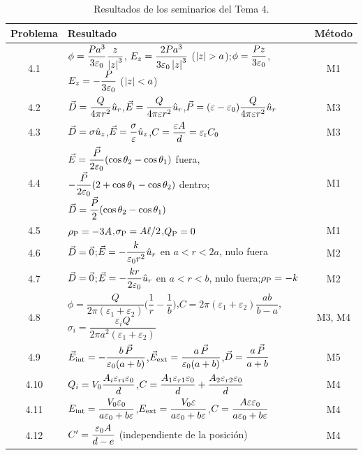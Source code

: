 \begin{table}[H]
\centering
\caption{Resultados de los seminarios del Tema 4.}\label{tab:resultados}
\small
\renewcommand{\arraystretch}{1.55}
\begin{tabularx}{\textwidth}{@{}c>{\raggedright\arraybackslash}Xc@{}}
\toprule
Problema & Resultado & Método\\
\midrule
4.1 & $\phi=\dfrac{Pa^3}{3\varepsilon_0}\dfrac{z}{\left\lvert z\right\rvert^3}$, $E_z=\dfrac{2Pa^3}{3\varepsilon_0\left\lvert z\right\rvert^3}$ ($\left\lvert z\right\rvert>a$);\quad $\phi=\dfrac{Pz}{3\varepsilon_0}$, $E_z=-\dfrac{P}{3\varepsilon_0}$ ($\left\lvert z\right\rvert<a$) & M1\\
4.2 & $\vec D=\dfrac{Q}{4\pi r^2}\hat u_{r}$,\quad $\vec E=\dfrac{Q}{4\pi\varepsilon r^2}\hat u_{r}$,\quad $\vec P=(\varepsilon-\varepsilon_0)\dfrac{Q}{4\pi\varepsilon r^2}\hat u_{r}$ & M3\\
4.3 & $\vec D=\sigma\hat u_{z}$,\quad $\vec E=\dfrac{\sigma}{\varepsilon}\hat u_{z}$,\quad $C=\dfrac{\varepsilon A}{d}=\varepsilon_{\mathrm r} C_0$ & M3\\
4.4 & $\vec E=\dfrac{\vec P}{2\varepsilon_0}(\cos\theta_2-\cos\theta_1)$ fuera, $-\dfrac{\vec P}{2\varepsilon_0}(2+\cos\theta_1-\cos\theta_2)$ dentro;\quad $\vec D=\dfrac{\vec P}{2}(\cos\theta_2-\cos\theta_1)$ & M1\\
4.5 & $\rho_{\mathrm P}=-3A$,\quad $\sigma_{\mathrm P}=A\ell/2$,\quad $Q_{\mathrm P}=0$ & M1\\
4.6 & $\vec D=\vec 0$;\quad $\vec E=-\dfrac{k}{\varepsilon_0 r^2}\hat u_{r}$ en $a<r<2a$, nulo fuera & M2\\
4.7 & $\vec D=\vec 0$;\quad $\vec E=-\dfrac{kr}{2\varepsilon_0}\hat u_{r}$ en $a<r<b$, nulo fuera;\quad $\rho_{\mathrm P}=-k$ & M2\\
4.8 & $\phi=\dfrac{Q}{2\pi(\varepsilon_1+\varepsilon_2)}\Big(\dfrac1r-\dfrac1b\Big)$,\quad $C=2\pi(\varepsilon_1+\varepsilon_2)\dfrac{ab}{b-a}$,\quad $\sigma_i=\dfrac{\varepsilon_iQ}{2\pi a^2(\varepsilon_1+\varepsilon_2)}$ & M3, M4\\
4.9 & $\vec E_{\mathrm{int}}=-\dfrac{b\,\vec P}{\varepsilon_0(a+b)}$,\quad $\vec E_{\mathrm{ext}}=\dfrac{a\,\vec P}{\varepsilon_0(a+b)}$,\quad $\vec D=\dfrac{a\,\vec P}{a+b}$ & M5\\
4.10 & $Q_i=V_0\dfrac{A_i\varepsilon_{ri}\varepsilon_0}{d}$,\quad $C=\dfrac{A_1\varepsilon_{r1}\varepsilon_0}{d}+\dfrac{A_2\varepsilon_{r2}\varepsilon_0}{d}$ & M4\\
4.11 & $E_{\mathrm{int}}=\dfrac{V_0\varepsilon_0}{a\varepsilon_0+b\varepsilon}$,\quad $E_{\mathrm{ext}}=\dfrac{V_0\varepsilon}{a\varepsilon_0+b\varepsilon}$,\quad $C=\dfrac{A\varepsilon\varepsilon_0}{a\varepsilon_0+b\varepsilon}$ & M4\\
4.12 & $C'=\dfrac{\varepsilon_0 A}{d-e}$ (independiente de la posición) & M4\\
\bottomrule
\end{tabularx}
\end{table}

